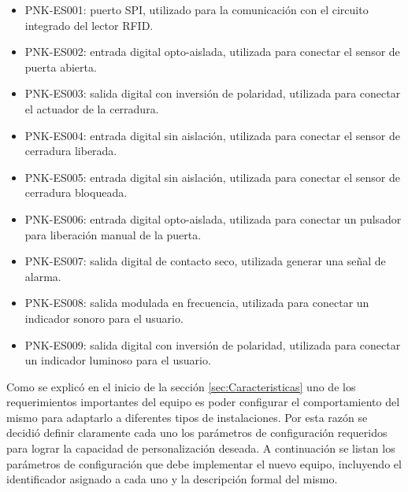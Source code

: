 \begin{itemize}
	\item PNK-ES001: puerto SPI, utilizado para la comunicación con el circuito integrado del lector RFID.
	\item PNK-ES002: entrada digital opto-aislada, utilizada para conectar el sensor de puerta abierta.
	\item PNK-ES003: salida digital con inversión de polaridad, utilizada para conectar el actuador de la cerradura.
	\item PNK-ES004: entrada digital sin aislación, utilizada para conectar el sensor de cerradura liberada.
	\item PNK-ES005: entrada digital sin aislación, utilizada para conectar el sensor de cerradura bloqueada.
	\item PNK-ES006: entrada digital opto-aislada, utilizada para conectar un pulsador para liberación manual de la puerta.
	\item PNK-ES007: salida digital de contacto seco, utilizada generar una señal de alarma.
	\item PNK-ES008: salida modulada en frecuencia, utilizada para conectar un indicador sonoro para el usuario.
	\item PNK-ES009: salida digital con inversión de polaridad, utilizada para conectar un indicador luminoso para el usuario.
\end{itemize}

Como se explicó en el inicio de la sección \ref{sec:Caracteristicas} uno de los requerimientos importantes del equipo es poder configurar el comportamiento del mismo para adaptarlo a diferentes tipos de instalaciones. Por esta razón se decidió definir claramente cada uno los parámetros de configuración requeridos para lograr la capacidad de personalización deseada. A continuación se listan los parámetros de configuración que debe implementar el nuevo equipo, incluyendo el identificador asignado a cada uno y la descripción formal del mismo.

